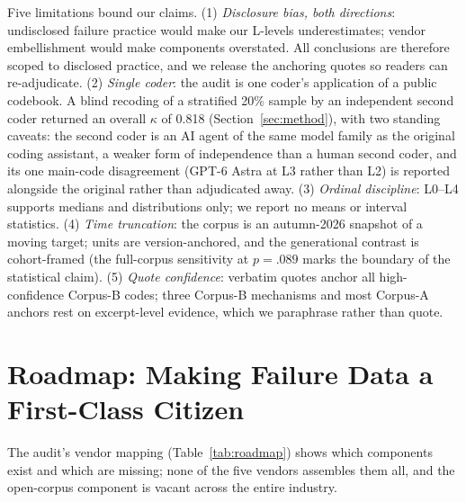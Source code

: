 \documentclass[10pt]{article}
\begin{document}
Five limitations bound our claims. (1) \emph{Disclosure bias, both directions}: undisclosed failure practice would make our L-levels underestimates; vendor embellishment would make components overstated. All conclusions are therefore scoped to disclosed practice, and we release the anchoring quotes so readers can re-adjudicate. (2) \emph{Single coder}: the audit is one coder's application of a public codebook. A blind recoding of a stratified 20\% sample by an independent second coder returned an overall $\kappa$ of 0.818 (Section~\ref{sec:method}), with two standing caveats: the second coder is an AI agent of the same model family as the original coding assistant, a weaker form of independence than a human second coder, and its one main-code disagreement (GPT-6 Astra at L3 rather than L2) is reported alongside the original rather than adjudicated away. (3) \emph{Ordinal discipline}: L0--L4 supports medians and distributions only; we report no means or interval statistics. (4) \emph{Time truncation}: the corpus is an autumn-2026 snapshot of a moving target; units are version-anchored, and the generational contrast is cohort-framed (the full-corpus sensitivity at $p = .089$ marks the boundary of the statistical claim). (5) \emph{Quote confidence}: verbatim quotes anchor all high-confidence Corpus-B codes; three Corpus-B mechanisms and most Corpus-A anchors rest on excerpt-level evidence, which we paraphrase rather than quote.

\section{Roadmap: Making Failure Data a First-Class Citizen}\label{sec:roadmap}

The audit's vendor mapping (Table~\ref{tab:roadmap}) shows which components exist and which are missing; none of the five vendors assembles them all, and the open-corpus component is vacant across the entire industry.
\end{document}
